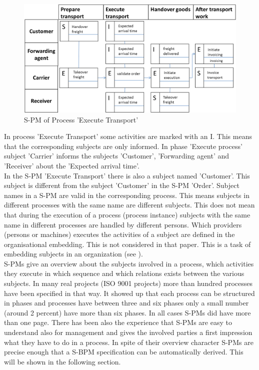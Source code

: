 \begin{figure}[hbtp]
	\includegraphics[scale=0.2]{Figures/Chapter5/Subject-Phase/execute-transport.png}
	\caption{S-PM of Process 'Execute Transport'}
	\label{fig:S-PM-Execute-Trans}
\end{figure}


In process 'Execute Transport' some activities are marked with an I. This means that the corresponding subjects are only informed. In phase 'Execute process' subject 'Carrier' informs the subjects 'Customer', 'Forwarding agent' and 'Receiver' about the 'Expected arrival time'.
\\
In the S-PM 'Execute Transport' there is also a subject named 'Customer'. This subject is different from the subject 'Customer' in the S-PM 'Order'. Subject names in a S-PM are valid in the corresponding process. This means subjects in different processes with the same name are different subjects. This does not mean that during the execution of a process (process instance) subjects with the same name in different processes are handled by different persons. Which providers (persons or machines) executes the activities of a subject are defined in the organisational embedding. This is not considered in that paper. This is a task of embedding subjects in an organization (see \cite{book:flei2011}).
\\
S-PMs give an overview about the subjects involved in a process, which activities they execute in which sequence and which relations exists between the various subjects. In many real projects (ISO 9001 projects) more than hundred processes have been specified in that way. It showed up that each process can be structured in phases and processes have between three and six phases only a small number (around 2 percent) have more than six phases. In all cases S-PMs did have more than one page. There has been also the experience that S-PMs are easy to understand also for management and gives the involved parties a first impression what they have to do in a process. In spite of their overview character S-PMs are precise enough that a S-BPM specification can be automatically derived. This will be shown in the following section.

